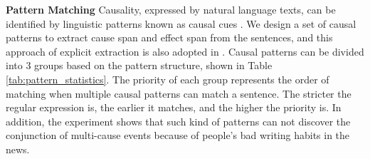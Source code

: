 \textbf{Pattern Matching}
Causality, expressed by natural language texts, can be identified by linguistic patterns known as causal cues \cite{Chang2005}.
We design a set of causal patterns to extract cause span and effect span from the sentences, and this approach of explicit extraction is also adopted in \cite{Luo2016a,Zhao2017,Radinsky2012}. Causal patterns can be divided into 3 groups based on the pattern structure, shown in Table \ref{tab:pattern_statistics}. The priority of each group represents the order of matching when multiple causal patterns can match a sentence. The stricter the regular expression is, the earlier it matches, and the higher the priority is. In addition, the experiment shows that such kind of patterns can not discover the conjunction of multi-cause events because of people's bad writing habits in the news. 
%
%




